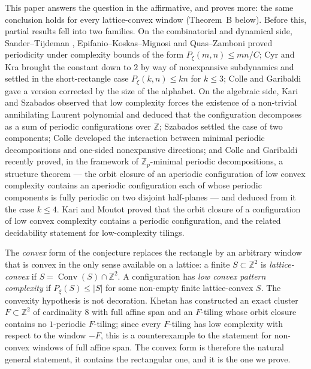 \documentclass[11pt,reqno]{amsart}
\theoremstyle{plain}
\theoremstyle{definition}
\theoremstyle{remark}
\theoremstyle{plain}
\theoremstyle{remark}
\theoremstyle{definition}
\numberwithin{equation}{section}
\DeclareMathOperator{\Conv}{Conv}
\newcommand{\Z}{\mathbb{Z}}
\begin{document}
This paper answers the question in the affirmative, and proves more: the
same conclusion holds for every lattice-convex window (Theorem~B below).
Before this, partial results fell into two families.  On the
combinatorial and dynamical side, Sander--Tijdeman \cite{ST},
Epifanio--Koskas--Mignosi \cite{EKM} and Quas--Zamboni \cite{QZ} proved
periodicity under complexity bounds of the form $P_\xi(m,n)\le mn/C$; Cyr and
Kra \cite{CyrKra15} brought the constant down to $2$ by way of nonexpansive
subdynamics and settled in \cite{CyrKra16} the short-rectangle case
$P_\xi(k,n)\le kn$ for $k\le3$; Colle and Garibaldi \cite{CGalpha} gave a
version corrected by the size of the alphabet.  On the algebraic side,
Kari and Szabados \cite{KS} observed that low complexity forces the existence of
a non-trivial annihilating Laurent polynomial and deduced that the configuration
decomposes as a sum of periodic configurations over $\Z$; Szabados \cite{Sz}
settled the case of two components; Colle \cite{Colle23a,Colle23b} developed
the interaction between minimal periodic decompositions and one-sided
nonexpansive directions; and Colle and Garibaldi \cite{CG} recently proved, in
the framework of $\Z_p$-minimal periodic decompositions, a structure theorem —
the orbit closure of an aperiodic configuration of low convex complexity
contains an aperiodic configuration each of whose periodic components is fully
periodic on two disjoint half-planes — and deduced from it the case $k\le4$.
Kari and Moutot \cite{KM20,KM23} proved that the orbit closure of a
configuration of low convex complexity contains a periodic configuration, and
the related decidability statement for low-complexity tilings.

The \emph{convex} form of the conjecture replaces the rectangle by an arbitrary
window that is convex in the only sense available on a lattice: a finite
$S\subset\Z^2$ is \emph{lattice-convex} if $S=\Conv(S)\cap\Z^2$.  A
configuration has \emph{low convex pattern complexity} if $P_\xi(S)\le|S|$ for
some non-empty finite lattice-convex $S$.  The convexity hypothesis is not
decoration.  Khetan \cite{Khe} has constructed an exact cluster
$F\subset\Z^2$ of cardinality $8$ with full affine span and an $F$-tiling whose
orbit closure contains no $1$-periodic $F$-tiling; since every $F$-tiling has
low complexity with respect to the window $-F$, this is a counterexample to the
statement for non-convex windows of full affine span.  The convex form is
therefore the natural general statement, it contains the rectangular one, and
it is the one we prove.
\end{document}
